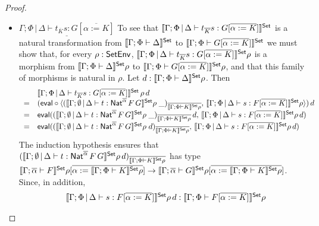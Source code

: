 \documentclass[acmsmall,review,anonymous]{acmart}
\theoremstyle{definition}
\begin{document}
\begin{proof}
\begin{itemize}
\item 
$\underline{\Gamma;\Phi \,|\, \Delta \vdash t_{\overline K} s: G
  [\overline{\alpha := K}]}$\; 
  To see that $\llbracket{\Gamma;\Phi \,|\,
  \Delta \vdash t_{\overline K} s: G [\overline{\alpha := K}]}\rrbracket^{\mathsf{Set}}$ is a
  natural transformation from $\llbracket{\Gamma; \Phi \vdash \Delta}\rrbracket^{\mathsf{Set}}$ to
  $\llbracket{\Gamma;\Phi \vdash G [\overline{\alpha := K}]}\rrbracket^{\mathsf{Set}}$ we must
  show that, for every $\rho : \mathsf{SetEnv}$, $\llbracket{\Gamma;\Phi \,|\,
    \Delta \vdash t_{\overline K} s: G [\overline{\alpha := K}]}\rrbracket^{\mathsf{Set}}\rho$
  is a morphism from $\llbracket{\Gamma; \Phi \vdash \Delta}\rrbracket^{\mathsf{Set}}\rho$ to
  $\llbracket{\Gamma;\Phi \vdash G [\overline{\alpha := K}]}\rrbracket^{\mathsf{Set}}\rho$, and
  that this family of morphisms is natural in $\rho$. Let $d :
  \llbracket{\Gamma; \Phi \vdash \Delta}\rrbracket^{\mathsf{Set}}\rho$. Then
  \[\begin{array}{ll}
  & \llbracket{\Gamma;\Phi \,|\, \Delta \vdash t_{\overline K} s: G
  [\overline{\alpha := K}]}\rrbracket^{\mathsf{Set}}\,\rho\,d\\
= & (\mathsf{eval} \circ \langle (\llbracket{\Gamma; \emptyset \,|\, \Delta \vdash
  t : \mathsf{Nat}^{\overline{\alpha}} \,F \,G}\rrbracket^{\mathsf{Set}}\rho\;
\_)_{\overline{\llbracket{\Gamma;\Phi \vdash K}\rrbracket^{\mathsf{Set}}\rho}},\,
\llbracket{\Gamma;\Phi \,|\, \Delta \vdash s: F [\overline{\alpha :=
      K}]}\rrbracket^{\mathsf{Set}}\rho \rangle)\,d\\
= & \mathsf{eval} ((\llbracket{\Gamma; \emptyset \,|\, \Delta \vdash t :
  \mathsf{Nat}^{\overline{\alpha}} \,F \,G}\rrbracket^{\mathsf{Set}}\rho\;
\_)_{\overline{\llbracket{\Gamma;\Phi \vdash K}\rrbracket^{\mathsf{Set}}\rho}} \,d,\,
\llbracket{\Gamma;\Phi \,|\, \Delta \vdash s: F [\overline{\alpha :=
      K}]}\rrbracket^{\mathsf{Set}}\rho\, d)\\
= & \mathsf{eval} ((\llbracket{\Gamma; \emptyset \,|\, \Delta \vdash t :
  \mathsf{Nat}^{\overline{\alpha}} \,F \,G}\rrbracket^{\mathsf{Set}}\rho\;
d)_{\overline{\llbracket{\Gamma;\Phi \vdash K}\rrbracket^{\mathsf{Set}}\rho}},\,
\llbracket{\Gamma;\Phi \,|\, \Delta \vdash s: F [\overline{\alpha :=
      K}]}\rrbracket^{\mathsf{Set}}\rho\, d)\\
\end{array}\]
The induction hypothesis ensures that $(\llbracket{\Gamma; \emptyset \,|\,
  \Delta \vdash t : \mathsf{Nat}^{\overline{\alpha}} \,F \,G}\rrbracket^{\mathsf{Set}}\rho\,
d)_{\overline{\llbracket{\Gamma;\Phi \vdash K}\rrbracket^{\mathsf{Set}}\rho}}$ has type
$\llbracket{\Gamma; \overline{\alpha} \vdash F}\rrbracket^{\mathsf{Set}}\rho[\overline{\alpha :=
    \llbracket{\Gamma;\Phi \vdash K}\rrbracket^{\mathsf{Set}}\rho}] \to \llbracket{\Gamma;
  \overline{\alpha} \vdash G}\rrbracket^{\mathsf{Set}}\rho[\overline{\alpha := \llbracket{\Gamma;\Phi \vdash
      K}\rrbracket^{\mathsf{Set}}\rho}]$.  Since, in addition, 
\[\begin{array}{ll}
  &\llbracket{\Gamma;\Phi \,|\,
  \Delta \vdash s: F [\overline{\alpha := K}]}\rrbracket^{\mathsf{Set}}\rho\, d :
\llbracket{\Gamma; \Phi \vdash F[\overline{\alpha := K}]}\rrbracket^{\mathsf{Set}}\rho \\ 

\end{array}\]
\end{itemize}
\end{proof}
\end{document}
